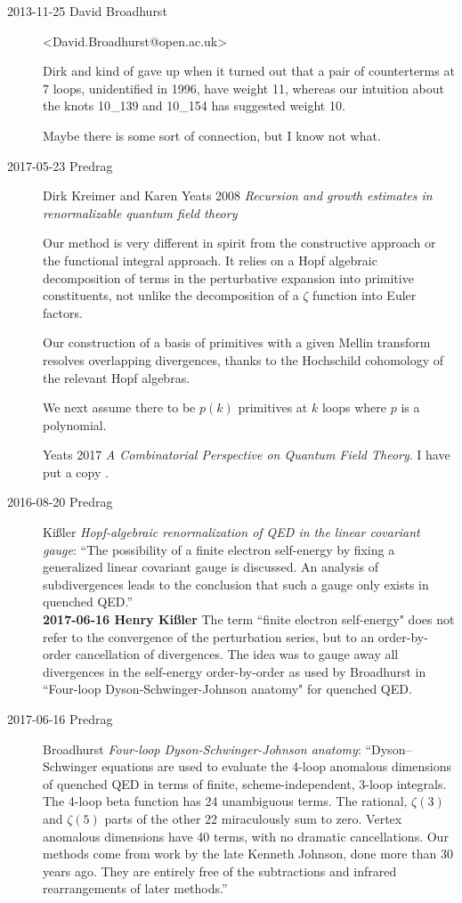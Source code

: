 \begin{description}
\item[2013-11-25  David Broadhurst] <David.Broadhurst@open.ac.uk>

Dirk and kind of gave up when it turned out that a pair
of counterterms at 7 loops, unidentified in 1996,
have weight 11, whereas our intuition about the
knots 10\_139 and 10\_154 has suggested weight 10.

Maybe there is some sort of connection, but I know not what.

\item[2017-05-23 Predrag]
Dirk Kreimer and
{Karen Yeats} 2008
{\em Recursion and growth estimates in renormalizable quantum field theory}

Our method is very different in spirit from the constructive approach or the functional
integral approach. It relies on a Hopf algebraic decomposition of terms in the perturbative
expansion into primitive constituents, not unlike the decomposition of a $\zeta$ function
into Euler factors.

Our construction of a basis of primitives with a given Mellin
transform resolves overlapping divergences, thanks to the Hochschild cohomology of
the relevant Hopf algebras.

We next assume there to be $p(k)$ primitives at $k$ loops where $p$ is a
polynomial.

Yeats 2017 {\em {A Combinatorial Perspective on Quantum Field Theory}}.
I have put a copy .

\item[2016-08-20 Predrag]
Ki{\ss}ler
{\em Hopf-algebraic renormalization of QED in the linear covariant gauge}:
``The possibility of a finite electron self-energy by fixing a
generalized linear covariant gauge is discussed. An analysis of
subdivergences leads to the conclusion that such a gauge only exists in
quenched QED.''
\\{\bf 2017-06-16 Henry Ki{\ss}ler}
The term ``finite electron self-energy" does not refer to the convergence
of the perturbation series, but to an order-by-order cancellation of
divergences. The idea was to gauge away all divergences in the
self-energy order-by-order as used by Broadhurst in
``Four-loop Dyson-Schwinger-Johnson anatomy" for quenched QED.

\item[2017-06-16 Predrag]
Broadhurst {\em Four-loop Dyson-Schwinger-Johnson
anatomy}: ``Dyson–Schwinger equations are used to evaluate the 4-loop
anomalous dimensions of quenched QED in terms of finite,
scheme-independent, 3-loop integrals. The 4-loop beta function has 24
unambiguous terms. The rational, $\zeta(3)$ and $\zeta(5)$ parts of the
other 22 miraculously sum to zero. Vertex anomalous dimensions have 40
terms, with no dramatic cancellations. Our methods come from work by the
late Kenneth Johnson, done more than 30 years ago. They are entirely free
of the subtractions and infrared rearrangements of later methods.''


\end{description}
